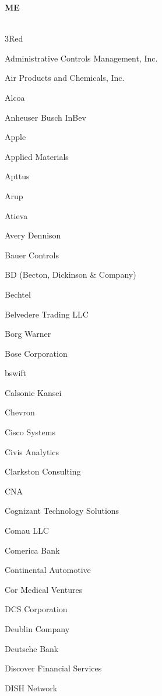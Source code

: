 \documentclass[twoside]{article}
\begin{document}
\begin{center}
\begin{multicols}{5}
\begin{FlushLeft}
        \end{FlushLeft}
        \vspace{1em}
        {\fontsize{14}{16}\selectfont \bf ME}\\
        \vspace{-1em}
        ~\hrulefill~
        \vspace{-.9em}
        \begin{FlushLeft}
        \begin{compactitem}
        \item 3Red
\item Administrative Controls Management, Inc.
\item Air Products and Chemicals, Inc.
\item Alcoa
\item Anheuser Busch InBev
\item Apple
\item Applied Materials
\item Apttus
\item Arup
\item Atieva
\item Avery Dennison
\item Bauer Controls
\item BD (Becton, Dickinson \& Company)
\item Bechtel
\item Belvedere Trading LLC
\item Borg Warner
\item Bose Corporation
\item bswift
\item Calsonic Kansei
\item Chevron
\item Cisco Systems
\item Civis Analytics
\item Clarkston Consulting
\item CNA
\item Cognizant Technology Solutions
\item Comau LLC
\item Comerica Bank
\item Continental Automotive
\item Cor Medical Ventures
\item DCS Corporation
\item Deublin Company
\item Deutsche Bank
\item Discover Financial Services
\item DISH Network

\end{compactitem}
\end{FlushLeft}
\end{multicols}
\end{center}
\end{document}
